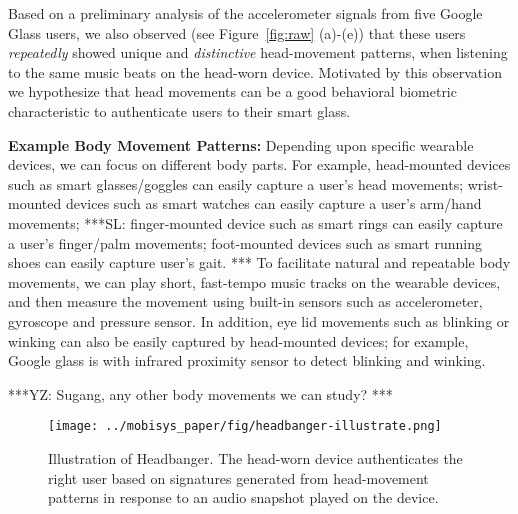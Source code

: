 Based on a
preliminary analysis of the accelerometer signals from five Google Glass
users, we also observed (see Figure~\ref{fig:raw} (a)-(e)) that these users
{\em repeatedly} showed unique and {\em distinctive} head-movement patterns,
when listening to the same music beats on the head-worn device.
Motivated by this observation we hypothesize that head movements
can be a good behavioral biometric characteristic to authenticate
users to their smart glass.

\vspace{4pt}\textbf{Example Body Movement Patterns:} Depending upon specific wearable devices, we can focus on different body parts. For example, head-mounted devices such as smart glasses/goggles can easily capture a user's head movements; wrist-mounted devices such as smart watches can easily capture a user's arm/hand movements; ***SL: finger-mounted device such as smart rings can easily capture a user's finger/palm movements; foot-mounted devices such as smart running shoes can easily capture user's gait. *** To facilitate natural and repeatable body movements, we can play short, fast-tempo music tracks on the wearable devices, and then measure the movement using built-in sensors such as accelerometer, gyroscope and pressure sensor. In addition, eye lid movements such as blinking or winking can also be easily captured by head-mounted devices; for example, Google glass is  with infrared proximity sensor to detect blinking and winking.

***YZ: Sugang, any other body movements we can study? ***

\begin{figure}
\centering
\texttt{[image: ../mobisys\_paper/fig/headbanger-illustrate.png]}
\caption{Illustration of Headbanger. The head-worn device authenticates the
right user based on signatures generated from head-movement patterns in
response to an audio snapshot played on the device.}
\label{fig:illustrate}
\end{figure}




